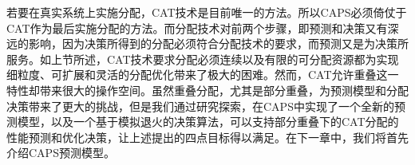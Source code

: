 若要在真实系统上实施分配，CAT技术是目前唯一的方法。所以CAPS必须倚仗于CAT作为最后实施分配的方法。而分配技术对前两个步骤，即预测和决策又有深远的影响，因为决策所得到的分配必须符合分配技术的要求，而预测又是为决策所服务。如上节所述，CAT技术要求分配必须连续以及有限的可分配资源都为实现细粒度、可扩展和灵活的分配优化带来了极大的困难。然而，CAT允许重叠这一特性却带来很大的操作空间。虽然重叠分配，尤其是部分重叠，为预测模型和分配决策带来了更大的挑战，但是我们通过研究探索，在CAPS中实现了一个全新的预测模型，以及一个基于模拟退火的决策算法，可以支持部分重叠下的CAT分配的性能预测和优化决策，让上述提出的四点目标得以满足。在下一章中，我们将首先介绍CAPS预测模型。

